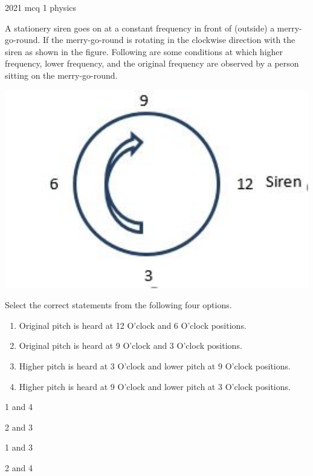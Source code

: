 \ylDisplay
{}%
{2021}%
{mcq}%
{1}%
{physics}%
{}%
{
\ifStatement
A stationery siren goes on at a constant frequency in front of (outside) a merry-go-round. If the merry-go-round is rotating in the clockwise direction with the siren as shown in the figure. Following are some conditions at which higher frequency, lower frequency, and the original frequency are observed by a person sitting on the merry-go-round.
\begin{center}
  \includegraphics[width=0.4\linewidth]{2021-mcq-01-p}
\end{center}
Select the correct statements from the following four options.
\begin{enumerate}
  \item Original pitch is heard at 12 O’clock and 6 O’clock positions.
  \item Original pitch is heard at 9 O’clock and 3 O’clock positions.
  \item Higher pitch is heard at 3 O’clock and lower pitch at 9 O’clock positions.
  \item Higher pitch is heard at 9 O’clock and lower pitch at 3 O’clock positions.
\end{enumerate}
\fi


1 and 4
\fi


2 and 3
\fi


1 and 3
\fi


2 and 4
\fi


\ifHint

\fi


\ifSolution

\fi


\ifEstStatement

\fi



\fi



\fi



\fi



\fi


\ifEstHint

\fi


\ifEstSolution

\fi
}
